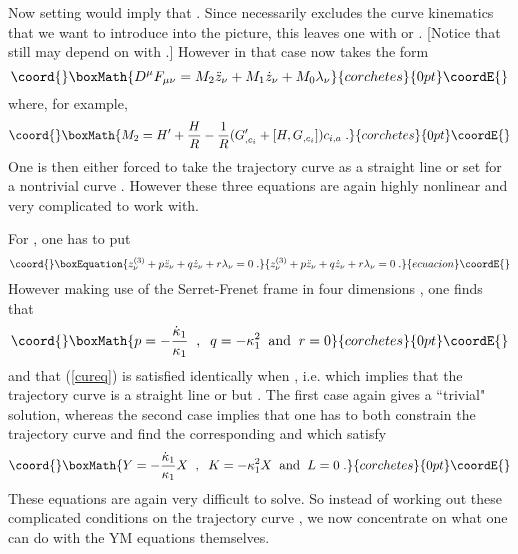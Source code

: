 \documentclass[a4paper,twocolumn,prd,showpacs,amsmath,amssymb]{revtex4}
\begin{document}
Now setting \coordHE{} would imply that \coordHE{}. Since \coordHE{}
necessarily excludes the curve kinematics that we want to introduce into the picture,
this leaves one with \coordHE{} or \coordHE{}. [Notice that \coordHE{} still
may depend on \coordHE{} with \coordHE{}.] However in that case
\coordHE{} now takes the form
\[\coord{}\boxMath{ D^{\mu} F_{\mu\nu} = M_{2} \ddot{z}_{\nu} + M_{1} \dot{z}_{\nu} + M_{0} \lambda_{\nu} }{corchetes}{0pt}\coordE{}\]
where, for example,
\[\coord{}\boxMath{ M_2 = H^{\prime} + \frac{H}{R} - \frac{1}{R}
(G^{\prime}_{,c_{i}} + [H,G_{,c_{i}}]) c_{i,a} \; . }{corchetes}{0pt}\coordE{}\]
One is then either forced to take the trajectory curve \coordHE{} as a straight line or
set \coordHE{} for a nontrivial curve \coordHE{}. However these three equations
\coordHE{} are again highly nonlinear and very complicated to work with.

For \coordHE{}, one has to put
\begin{equation}\coord{}\boxEquation{
z^{(3)}_{\nu} + p \ddot{z}_{\nu} + q \dot{z}_{\nu} + r \lambda_{\nu} = 0 \; .
\label{cureq}
}{
z^{(3)}_{\nu} + p \ddot{z}_{\nu} + q \dot{z}_{\nu} + r \lambda_{\nu} = 0 \; .
}{ecuacion}\coordE{}\end{equation}
However making use of the Serret-Frenet frame in four dimensions \cite{gs1}, one finds
that
\[\coord{}\boxMath{ p = - \frac{\dot{\kappa}_{1}}{\kappa_{1}} \;\; , \;\; q = - \kappa_{1}^2
\;\; \mbox{and} \;\; r=0 }{corchetes}{0pt}\coordE{}\]
and that (\ref{cureq}) is satisfied identically when \coordHE{}, i.e. \coordHE{}
which implies that the trajectory curve \coordHE{} is a straight line or \coordHE{}  \coordHE{} but \coordHE{}. The first case again gives a
``trivial" solution, whereas the second case implies that one has to both constrain
the trajectory curve \coordHE{} and find the corresponding \coordHE{} and \coordHE{} which satisfy
\[\coord{}\boxMath{ Y = - \frac{\dot{\kappa}_{1}}{\kappa_{1}} X \;\; , \;\; K = - \kappa_{1}^2 X
\;\; \mbox{and} \;\; L=0 \; .}{corchetes}{0pt}\coordE{}\]
These equations are again very difficult to solve. So instead of working out
these complicated conditions on the trajectory curve \coordHE{}, we now concentrate on
what one can do with the YM equations themselves.
\end{document}
